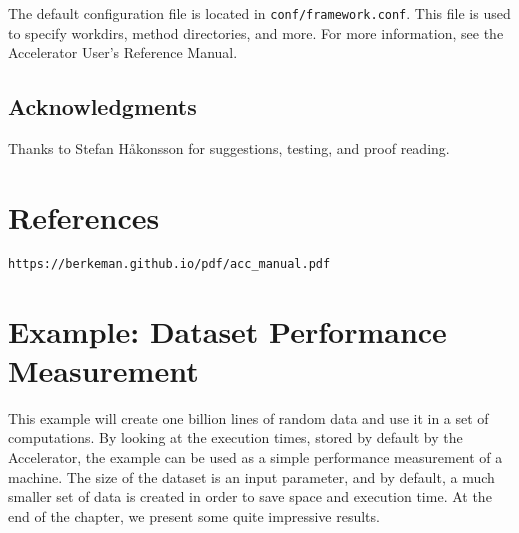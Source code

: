 \documentclass[a4paper]{article}
\begin{document}
The default configuration file is located in
\texttt{conf/framework.conf}.  This file is used to specify workdirs,
method directories, and more.  For more information, see the
Accelerator User's Reference Manual.


\vfill
\subsection*{Acknowledgments}
Thanks to Stefan H{\aa}konsson for suggestions, testing, and proof reading.


\section*{References}
\texttt{https://berkeman.github.io/pdf/acc\_manual.pdf}



\clearpage
\section*{Example:  Dataset Performance Measurement}
\label{example:datasetperf}

\begin{figure}[h]\centering
  
  \label{fig:ex2}
\end{figure}

This example will create one billion lines of random data and use it
in a set of computations.  By looking at the execution times, stored
by default by the Accelerator, the example can be used as a simple
performance measurement of a machine.  The size of the dataset is an
input parameter, and by default, a much smaller set of data is created
in order to save space and execution time.  At the end of the chapter,
we present some quite impressive results.
\end{document}
